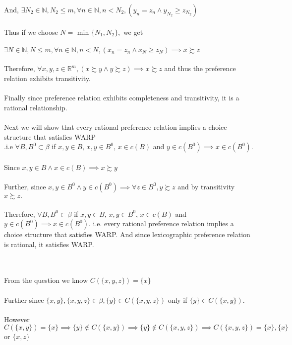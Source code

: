 \documentclass[12pt]{article}
\newenvironment{problem}[2][Problem]{\begin{trivlist}
\item[\hskip \labelsep {\bfseries #1}\hskip \labelsep {\bfseries #2.}]}{\end{trivlist}}
\begin{document}
\begin{problem}{4}
\\
And, $ \exists N_2 \in  \mathbb{N}, N_2 \leq m, \forall n \in \mathbb{N}, n < N_2, (y_n = z_n \land y_{N_2} \geq z_{N_2}) $ 
\\
\\
Thus if we choose $N = $ min $\{N_1, N_2 \}, $ we get 
\\
\\
$ \exists N \in  \mathbb{N}, N \leq m, \forall n \in \mathbb{N}, n < N, (x_n = z_n \land x_{N} \geq z_{N}) \implies x \succsim z$
\\
\\
Therefore, $\forall x, y, z \in \mathbb{R}^{m}, (x \succsim y \land y \succsim z) \implies x \succsim z$ and thus the preference relation exhibits transitivity.
\\
\\
Finally since preference relation exhibits completeness and transitivity, it is a rational relationship. 
\\
\\
Next we will show that every rational preference relation implies a choice structure that satisfies WARP\\ .i.e $ \forall B, B^0 \subset \beta $ if $ x, y \in B$, $ x, y \in B^0  $, $ x \in c(B) $ and $ y \in c(B^0) \implies x \in c(B^0). $ 
\\
\\
Since $ x, y \in B \land x \in c(B) \implies x \succsim y $ 
\\
\\
Further, since $ x, y \in B^0 \land y \in c(B^0) \implies \forall z \in B^0, y \succsim z $ and by transitivity $ x \succsim z. $
\\
\\
Therefore, $ \forall B, B^0 \subset \beta $ if $ x, y \in B$, $ x, y \in B^0  $, $ x \in c(B) $ and $ y \in c(B^0) \implies x \in c(B^0). $ i.e. every rational preference relation implies a choice structure that satisfies WARP. And since lexicographic preference relation is rational, it satisfies WARP. 
\\
\end{problem}
\begin{problem}{5}. 
\\
\\
From the question we know $ C(\{x,y,z \}) = \{x\}$
\\
\\
Further since $ \{x,y\} , \{x, y, z\} \in \beta , \{y\} \in C(\{x,y,z \})$ only if $ \{y\} \in C(\{x,y \})$.
\\
\\
However $C(\{x,y \}) = \{ x\} \implies \{ y\} \notin C(\{x,y \}) \implies \{ y\} \notin C(\{x,y, z \}) \implies C(\{x,y, z \}) = \{ x\} , \{ x\} $ or $ \{ x, z \}  $
\\
\\
\end{problem}
\end{document}
